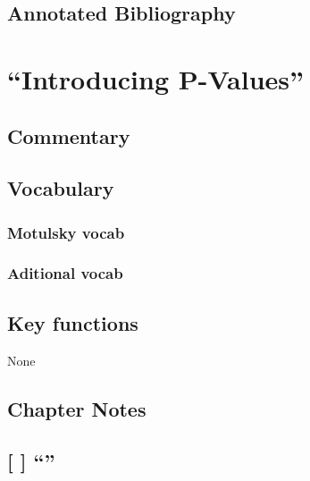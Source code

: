 \documentclass[]{book}
\theoremstyle{definition}
\theoremstyle{definition}
\theoremstyle{definition}
\theoremstyle{remark}
\begin{document}
\section*{Annotated Bibliography}\label{annotated-bibliography-5}

\chapter{\texorpdfstring{``Introducing
P-Values''}{Introducing P-Values}}\label{ch15}

\section*{Commentary}\label{commentary-13}

\section*{Vocabulary}\label{vocabulary-14}

\subsection*{Motulsky vocab}\label{motulsky-vocab-14}

\subsection*{Aditional vocab}\label{aditional-vocab-11}

\section*{Key functions}\label{key-functions-13}

None

\section*{Chapter Notes}\label{chapter-notes-14}

\section{\texorpdfstring{{[} {]} ``''}{{[} {]} }}\label{section-21}
\end{document}
